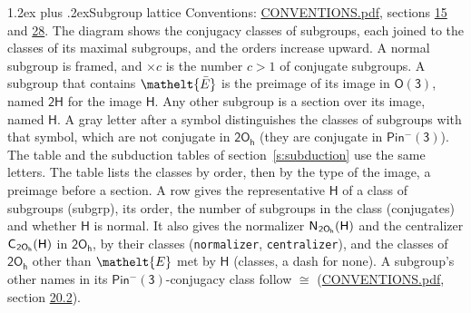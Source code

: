 \documentclass[10pt,a4paper]{article}
\makeatletter
\renewcommand\section{\@startsection{section}{1}{\z@}{-3ex plus -1ex minus -.2ex}%
  {1.2ex plus .2ex}{\normalfont\large\sffamily\bfseries\color{parttitle}}}
\numberwithin{equation}{section}
\newcommand{\eltfont}[1]{{\let\sigma\eltsigma\mathelt{#1}}}
\newcommand{\grp}[1]{\mathsf{#1}}
\newcommand{\cls}[1]{\eltfont{#1}}
\newcommand{\elt}[1]{\eltfont{#1}}
\newcommand{\samecls}{\cong}
\newcommand{\barred}[1]{\bar{#1}}
\newcommand{\hairsp}{\mkern1mu}
\makeatother
\begin{document}
\section{Subgroup lattice}\label{s:subgroups}
Conventions: \href{../../CONVENTIONS.pdf}{CONVENTIONS.pdf}, sections \href{../../../rotation/CONVENTIONS.pdf\#conv.15}{15} and \href{../../CONVENTIONS.pdf\#conv.28}{28}.
The diagram shows the conjugacy classes of subgroups, each joined to the classes of its maximal subgroups, and the orders increase upward. \label{n:index.conjugates.c}\label{n:mark.conjugates}A normal subgroup is framed, and ${\times}c$ is the number $c > 1$ of conjugate subgroups. \label{n:group.H}A subgroup that contains $\elt{\barred{E}}$ is the preimage of its image in $\grp{O(3)}$, named $\grp{2H}$ for the image $\grp{H}$. Any other subgroup is a section over its image, named $\grp{H}$. \label{n:mark.letter}A gray letter after a symbol distinguishes the classes of subgroups with that symbol, which are not conjugate in $\grp{2O_{h}}$ (they are conjugate in \href{Pinminus3.pdf}{$\grp{Pin^{-}(3)}$}). The table and the subduction tables of section~\ref{s:subduction} use the same letters. The table lists the classes by order, then by the type of the image, a preimage before a section. \label{n:head.subgroup}\label{n:head.order}\label{n:head.conjugates}\label{n:head.normal}A row gives the representative $\grp{H}$ of a class of subgroups (subgrp), its order, the number of subgroups in the class (conjugates) and whether $\grp{H}$ is normal. \label{n:group.normalizer}\label{n:group.centralizer}\label{n:head.classes}It also gives the normalizer $\grp{N}_{\hairsp \grp{2O_{h}}}(\grp{H})$ and the centralizer $\grp{C}_{\hairsp \grp{2O_{h}}}(\grp{H})$ in $\grp{2O_{h}}$, by their classes (\texttt{normalizer}, \texttt{centralizer}), and the classes of $\grp{2O_{h}}$ other than $\cls{E}$ met by $\grp{H}$ (classes, a dash for none). A subgroup's other names in its \href{Pinminus3.pdf}{$\grp{Pin^{-}(3)}$}-conjugacy class follow $\samecls$ (\href{../../CONVENTIONS.pdf}{CONVENTIONS.pdf}, section \href{../../CONVENTIONS.pdf\#conv.20.2}{20.2}).
\end{document}
